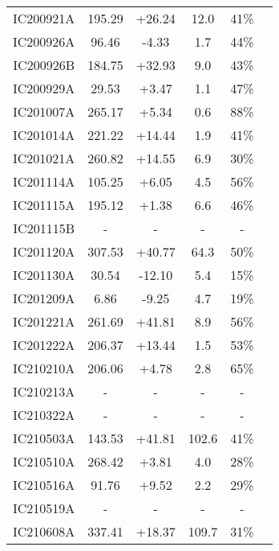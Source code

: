 \begin{longtable}[c]{||c c c c c c ||}
	IC200921A & 195.29 & +26.24 & 12.0 & 41\% & \cite{ic200921a} \\ 
	IC200926A & 96.46 & -4.33 & 1.7 & 44\% & \cite{ic200926a} \\ 
	IC200926B & 184.75 & +32.93 & 9.0 & 43\% & \cite{ic200926b} \\ 
	IC200929A & 29.53 & +3.47 & 1.1 & 47\% & \cite{ic200929a} \\ 
	IC201007A & 265.17 & +5.34 & 0.6 & 88\% & \cite{ic201007a} \\ 
	IC201014A & 221.22 & +14.44 & 1.9 & 41\% & \cite{ic201014a} \\ 
	IC201021A & 260.82 & +14.55 & 6.9 & 30\% & \cite{ic201021a} \\ 
	IC201114A & 105.25 & +6.05 & 4.5 & 56\% & \cite{ic201114a} \\ 
	IC201115A & 195.12 & +1.38 & 6.6 & 46\% & \cite{ic201115a} \\ 
	IC201115B & - & - & - & - & \cite{ic201115b} \\ 
	IC201120A & 307.53 & +40.77 & 64.3 & 50\% & \cite{ic201120a} \\ 
	IC201130A & 30.54 & -12.10 & 5.4 & 15\% & \cite{ic201130a} \\ 
	IC201209A & 6.86 & -9.25 & 4.7 & 19\% & \cite{ic201209a} \\ 
	IC201221A & 261.69 & +41.81 & 8.9 & 56\% & \cite{ic201221a} \\ 
	IC201222A & 206.37 & +13.44 & 1.5 & 53\% & \cite{ic201222a} \\ 
	IC210210A & 206.06 & +4.78 & 2.8 & 65\% & \cite{ic210210a} \\ 
	IC210213A & - & - & - & - & \cite{ic210213a} \\ 
	IC210322A & - & - & - & - & \cite{ic210322a} \\ 
	IC210503A & 143.53 & +41.81 & 102.6 & 41\% & \cite{ic210503a} \\ 
	IC210510A & 268.42 & +3.81 & 4.0 & 28\% & \cite{ic210510a} \\ 
	IC210516A & 91.76 & +9.52 & 2.2 & 29\% & \cite{ic210516a} \\ 
	IC210519A & - & - & - & - & \cite{ic210519a} \\ 
	IC210608A & 337.41 & +18.37 & 109.7 & 31\% & \cite{ic210608a} \\ 
	
\end{longtable}


​



